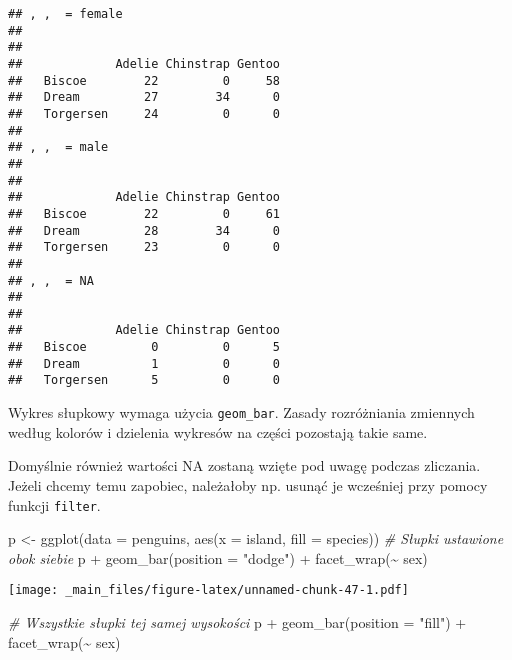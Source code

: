 \documentclass[
]{book}
\newenvironment{Shaded}{\begin{snugshade}}{\end{snugshade}}
\newcommand{\AttributeTok}[1]{\textcolor[rgb]{0.77,0.63,0.00}{#1}}
\newcommand{\CommentTok}[1]{\textcolor[rgb]{0.56,0.35,0.01}{\textit{#1}}}
\newcommand{\FunctionTok}[1]{\textcolor[rgb]{0.00,0.00,0.00}{#1}}
\newcommand{\NormalTok}[1]{#1}
\newcommand{\OtherTok}[1]{\textcolor[rgb]{0.56,0.35,0.01}{#1}}
\newcommand{\SpecialCharTok}[1]{\textcolor[rgb]{0.00,0.00,0.00}{#1}}
\newcommand{\StringTok}[1]{\textcolor[rgb]{0.31,0.60,0.02}{#1}}
\begin{document}
\begin{Shaded}
\end{Shaded}

\begin{verbatim}
## , ,  = female
## 
##            
##             Adelie Chinstrap Gentoo
##   Biscoe        22         0     58
##   Dream         27        34      0
##   Torgersen     24         0      0
## 
## , ,  = male
## 
##            
##             Adelie Chinstrap Gentoo
##   Biscoe        22         0     61
##   Dream         28        34      0
##   Torgersen     23         0      0
## 
## , ,  = NA
## 
##            
##             Adelie Chinstrap Gentoo
##   Biscoe         0         0      5
##   Dream          1         0      0
##   Torgersen      5         0      0
\end{verbatim}

Wykres słupkowy wymaga użycia \texttt{geom\_bar}. Zasady rozróżniania zmiennych według kolorów i dzielenia wykresów na części pozostają takie same.

Domyślnie również wartości NA zostaną wzięte pod uwagę podczas zliczania. Jeżeli chcemy temu zapobiec, należałoby np. usunąć je wcześniej przy pomocy funkcji \texttt{filter}.

\begin{Shaded}
\begin{Highlighting}[]
\NormalTok{p }\OtherTok{\textless{}{-}} \FunctionTok{ggplot}\NormalTok{(}\AttributeTok{data =}\NormalTok{ penguins, }\FunctionTok{aes}\NormalTok{(}\AttributeTok{x =}\NormalTok{ island, }\AttributeTok{fill =}\NormalTok{ species))}
\CommentTok{\# Słupki ustawione obok siebie}
\NormalTok{p }\SpecialCharTok{+} \FunctionTok{geom\_bar}\NormalTok{(}\AttributeTok{position =} \StringTok{"dodge"}\NormalTok{) }\SpecialCharTok{+} \FunctionTok{facet\_wrap}\NormalTok{(}\SpecialCharTok{\textasciitilde{}}\NormalTok{ sex)}
\end{Highlighting}
\end{Shaded}

\texttt{[image: \_main\_files/figure-latex/unnamed-chunk-47-1.pdf]}

\begin{Shaded}
\begin{Highlighting}[]
\CommentTok{\# Wszystkie słupki tej samej wysokości}
\NormalTok{p }\SpecialCharTok{+} \FunctionTok{geom\_bar}\NormalTok{(}\AttributeTok{position =} \StringTok{"fill"}\NormalTok{) }\SpecialCharTok{+} \FunctionTok{facet\_wrap}\NormalTok{(}\SpecialCharTok{\textasciitilde{}}\NormalTok{ sex)}
\end{Highlighting}
\end{Shaded}
\end{document}
